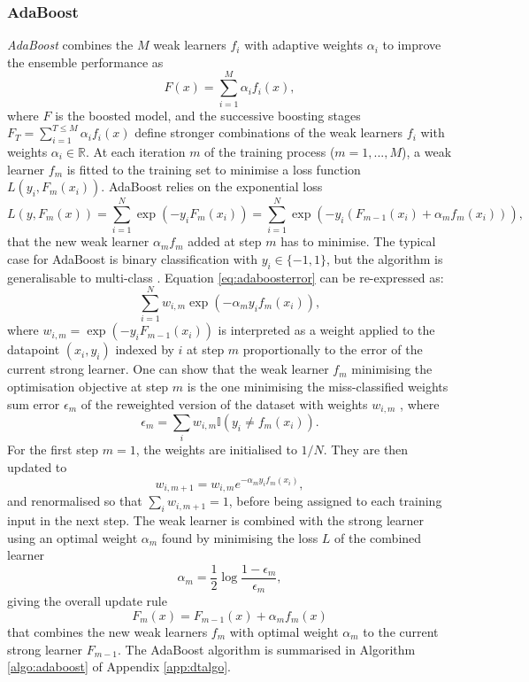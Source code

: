 \subsubsection{AdaBoost}\label{sub-adaboosted}
\textit{AdaBoost} combines the $M$ weak learners $f_i$ with adaptive weights $\alpha_i$ to improve the ensemble performance as \[F(x) = \sum_{i=1}^M \alpha_i f_i(x),\] where $F$ is the boosted model, and the successive boosting stages $F_T = \sum_{i=1}^{T \leq M} \alpha_i f_i(x)$ define stronger combinations of the weak learners $f_i$ with weights $\alpha_i \in \mathbb{R}$. At each iteration $m$ of the training process ($m = 1, ..., M$), a weak learner $f_m$ is fitted to the training set to minimise a loss function $L(y_i, F_{m}(x_i))$. AdaBoost relies on the exponential loss
\begin{equation}\label{eq:adaboosterror}
    L(y, F_m(x)) = \sum_{i=1}^N \exp\left(-y_i F_m(x_i)\right) = \sum_{i=1}^N \exp\left(-y_i (F_{m-1}(x_i) + \alpha_m f_m(x_i))\right),
\end{equation}
that the new weak learner $\alpha_m f_m$ added at step $m$ has to minimise. The typical case for AdaBoost is binary classification with $y_i \in \{-1, 1\}$, but the algorithm is generalisable to multi-class \cite{MurphyML}. Equation \ref{eq:adaboosterror} can be re-expressed as: \[\sum_{i=1}^N w_{i,m} \exp\left(-\alpha_m y_i f_m(x_i)\right),\] where $w_{i,m} = \exp\left(-y_i F_{m-1}(x_i)\right)$ is interpreted as a weight applied to the datapoint $(x_i, y_i)$  indexed by $i$ at step $m$ proportionally to the error of the current strong learner. One can show that the weak learner $f_m$ minimising the optimisation objective at step $m$ is the one minimising the miss-classified weights sum error $\epsilon_m$ of the reweighted version of the dataset with weights $w_{i,m}$ \cite{MurphyML}, where \[\epsilon_m = \sum_i w_{i,m} \mathbb{I}(y_i \neq f_m(x_i)).\] For the first step $m = 1$, the weights are initialised to $1 / N$. They are then updated to \[w_{i,m+1} = w_{i,m} e^{-\alpha_m y_i f_m(x_i)},\] and renormalised so that $\sum_i w_{i, m+1} = 1$, before being assigned to each training input in the next step. The weak learner is combined with the strong learner using an optimal weight $\alpha_m$ found by minimising the loss $L$ of the combined learner \[\alpha_m = \frac{1}{2} \log \frac{1 - \epsilon_m}{\epsilon_m},\] giving the overall update rule
\begin{equation}\label{eq:updateOverall}
    F_m(x) = F_{m-1}(x) + \alpha_m f_m(x)
\end{equation}
that combines the new weak learners $f_m$ with optimal weight $\alpha_m$ to the current strong learner $F_{m-1}$. The AdaBoost algorithm is summarised in Algorithm \ref{algo:adaboost} of Appendix \ref{app:dtalgo}.

